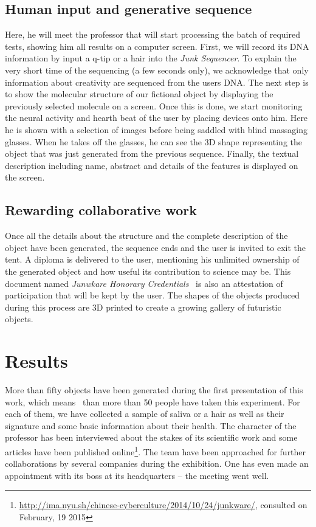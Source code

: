 \bigskip

\subsection[Human input and generative sequence]{Human input and generative
sequence}
Here, he will meet the professor that will start processing the batch of
required tests, showing him all results on a computer screen. First, we
will record its DNA information by input a q-tip or a hair into the
\textit{Junk Sequencer}. To explain the very short time of the
sequencing (a few seconds only), we acknowledge that only information
about creativity are sequenced from the user{\textquotesingle}s DNA.
The next step is to show the molecular structure of our fictional
object by displaying the previously selected molecule on a screen. Once
this is done, we start monitoring the neural activity and hearth beat
of the user by placing devices onto him. Here he is shown with a
selection of images before being saddled with blind massaging glasses.
When he takes off the glasses, he can see the 3D shape representing the
object that was just generated from the previous sequence. Finally, the
textual description including name, abstract and details of the
features is displayed on the screen. 

\subsection{Rewarding collaborative work}
Once all the details about the structure and the complete description of
the object have been generated, the sequence ends and the user is
invited to exit the tent. A diploma is delivered to the user,
mentioning his unlimited ownership of the generated object and how
useful its contribution to science may be. This document named
\textit{Junwkare Honorary Credentials }\ is also an attestation of
participation that will be kept by the user. The shapes of the objects
produced during this process are 3D printed to create a growing gallery
of futuristic objects.


\bigskip

\section{Results }
More than fifty objects have been generated during the first
presentation of this work, which means \ than more than 50 people have
taken this experiment. For each of them, we have collected a sample of
saliva or a hair as well as their signature and some basic information
about their health. The character of the professor has been interviewed
about the stakes of its scientific work and some articles have been
published
online\footnote{\url{http://ima.nyu.sh/chinese-cyberculture/2014/10/24/junkware/},
consulted on February, 19 2015}. The team have been approached for
further collaborations by several companies during the exhibition. One
has even made an appointment with its boss at its headquarters -- the
meeting went well. 

